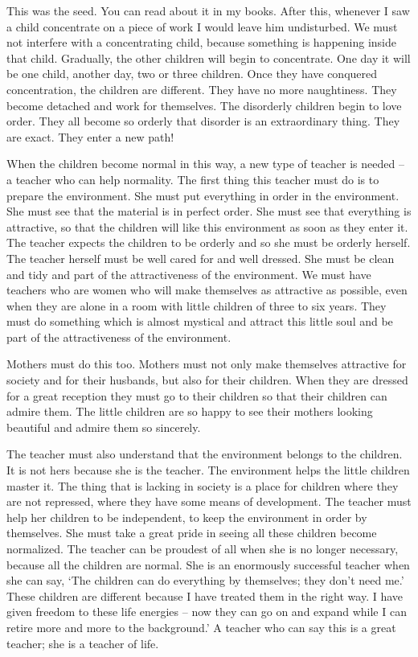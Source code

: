 \documentclass[lang=cn,10pt]{elegantbook}
\begin{document}
This was the seed. You can read about it in my books. After
this, whenever I saw a child concentrate on a piece of work I would
leave him undisturbed. We must not interfere with a concentrating
child, because something is happening inside that child. Gradually,
the other children will begin to concentrate. One day it will be one
child, another day, two or three children. Once they have conquered
concentration, the children are different. They have no more
naughtiness. They become detached and work for themselves. The
disorderly children begin to love order. They all become so orderly
that disorder is an extraordinary thing. They are exact. They enter a
new path!

When the children become normal in this way, a new type of
teacher is needed – a teacher who can help normality. The first thing
this teacher must do is to prepare the environment. She must put
everything in order in the environment. She must see that the
material is in perfect order. She must see that everything is
attractive, so that the children will like this environment as soon as
they enter it. The teacher expects the children to be orderly and so
she must be orderly herself. The teacher herself must be well cared
for and well dressed. She must be clean and tidy and part of the
attractiveness of the environment. We must have teachers who are
women who will make themselves as attractive as possible, even
when they are alone in a room with little children of three to six
years. They must do something which is almost mystical and attract
this little soul and be part of the attractiveness of the environment.

Mothers must do this too. Mothers must not only make
themselves attractive for society and for their husbands, but also for
their children. When they are dressed for a great reception they must
go to their children so that their children can admire them. The little
children are so happy to see their mothers looking beautiful and
admire them so sincerely.

The teacher must also understand that the environment belongs
to the children. It is not hers because she is the teacher. The
environment helps the little children master it. The thing that is
lacking in society is a place for children where they are not
repressed, where they have some means of development. The
teacher must help her children to be independent, to keep the
environment in order by themselves. She must take a great pride in
seeing all these children become normalized. The teacher can be
proudest of all when she is no longer necessary, because all the
children are normal. She is an enormously successful teacher when
she can say, ‘The children can do everything by themselves; they
don’t need me.’ These children are different because I have treated
them in the right way. I have given freedom to these life energies –
now they can go on and expand while I can retire more and more to
the background.’ A teacher who can say this is a great teacher; she
is a teacher of life.
\end{document}

